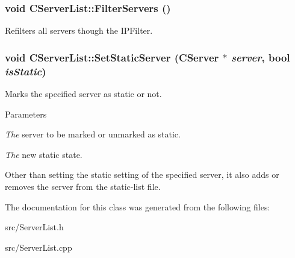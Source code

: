 \subsubsection[{FilterServers}]{\setlength{\rightskip}{0pt plus 5cm}void CServerList::FilterServers ()}\label{classCServerList_a44cbd766265e3bdcb17677365d1e9660}


Refilters all servers though the IPFilter. 
\subsubsection[{SetStaticServer}]{\setlength{\rightskip}{0pt plus 5cm}void CServerList::SetStaticServer ({\bf CServer} $\ast$ {\em server}, \/  bool {\em isStatic})}\label{classCServerList_af2b4e04236174e8c57043eab0591c176}


Marks the specified server as static or not. 
\begin{DoxyParams}{Parameters}
\item[{\em The}]server to be marked or unmarked as static. \item[{\em The}]new static state.\end{DoxyParams}
Other than setting the static setting of the specified server, it also adds or removes the server from the static-\/list file. 

The documentation for this class was generated from the following files:\begin{DoxyCompactItemize}
\item 
src/ServerList.h\item 
src/ServerList.cpp\end{DoxyCompactItemize}
